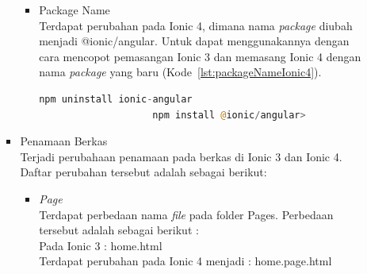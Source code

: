 \begin{enumerate}
\begin{enumerate}
\begin{itemize}
\begin{itemize}
				\item Package Name \\
				Terdapat perubahan pada Ionic 4, dimana nama {\it package} diubah menjadi @ionic/angular. Untuk dapat menggunakannya dengan cara mencopot pemasangan Ionic 3 dan memasang Ionic 4 dengan nama {\it package} yang baru (Kode~\ref{lst:packageNameIonic4}).
				\begin{lstlisting}[language=php, label={lst:packageNameIonic4}, caption=Pencopotan Ionic 3 dan Pemasangan Ionic 4 dengan nama {\it package} baru]
					npm uninstall ionic-angular
					npm install @ionic/angular>
				\end{lstlisting}
			\end{itemize}
	
			
	


	

			\item Penamaan Berkas \\
			Terjadi perubahaan penamaan pada berkas di Ionic 3 dan Ionic 4. Daftar perubahan tersebut adalah sebagai berikut:
			\begin{itemize}
				\item {\it Page} \\
				Terdapat perbedaan nama {\it file} pada folder Pages. Perbedaan tersebut adalah sebagai berikut :\\
				Pada Ionic 3 : home.html  \\
				Terdapat perubahan pada Ionic 4 menjadi : home.page.html
	

\end{itemize}
\end{itemize}
\end{enumerate}
\end{enumerate}
